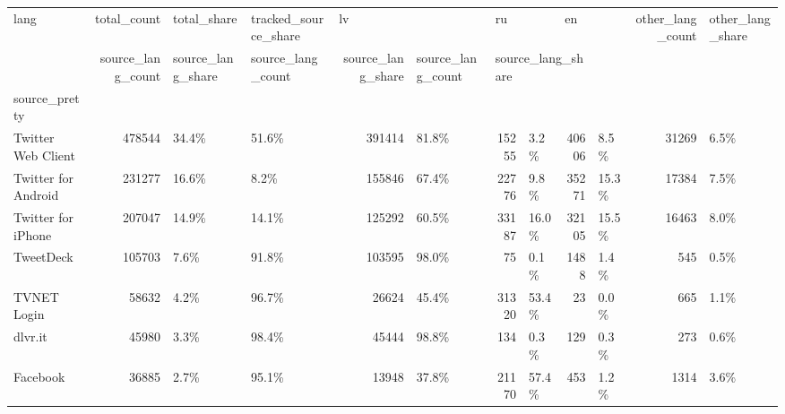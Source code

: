 \begin{tabular}{lrllrlrlrlrl}
\toprule
lang & total\_count & total\_share & tracked\_source\_share & \multicolumn{2}{l}{lv} & \multicolumn{2}{l}{ru} & \multicolumn{2}{l}{en} & other\_lang\_count & other\_lang\_share \\
{} & source\_lang\_count & source\_lang\_share & source\_lang\_count & source\_lang\_share & source\_lang\_count & \multicolumn{3}{l}{source\_lang\_share} \\
source\_pretty       &             &             &                      &                   &                   &                   &                   &                   &                   &                  &                  \\
\midrule
Twitter Web Client  &      478544 &       34.4\% &                51.6\% &            391414 &             81.8\% &             15255 &              3.2\% &             40606 &              8.5\% &            31269 &             6.5\% \\
Twitter for Android &      231277 &       16.6\% &                 8.2\% &            155846 &             67.4\% &             22776 &              9.8\% &             35271 &             15.3\% &            17384 &             7.5\% \\
Twitter for iPhone  &      207047 &       14.9\% &                14.1\% &            125292 &             60.5\% &             33187 &             16.0\% &             32105 &             15.5\% &            16463 &             8.0\% \\
TweetDeck           &      105703 &        7.6\% &                91.8\% &            103595 &             98.0\% &                75 &              0.1\% &              1488 &              1.4\% &              545 &             0.5\% \\
TVNET Login         &       58632 &        4.2\% &                96.7\% &             26624 &             45.4\% &             31320 &             53.4\% &                23 &              0.0\% &              665 &             1.1\% \\
dlvr.it             &       45980 &        3.3\% &                98.4\% &             45444 &             98.8\% &               134 &              0.3\% &               129 &              0.3\% &              273 &             0.6\% \\
Facebook            &       36885 &        2.7\% &                95.1\% &             13948 &             37.8\% &             21170 &             57.4\% &               453 &              1.2\% &             1314 &             3.6\% \\

\end{tabular}
